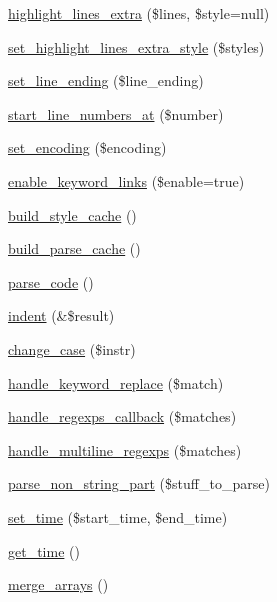 \begin{DoxyCompactItemize}
\item 
\hyperlink{class_ge_s_hi_ae1b0545f4143201ac3055abc0854196d}{highlight\-\_\-lines\-\_\-extra} (\$lines, \$style=null)
\item 
\hyperlink{class_ge_s_hi_af9596b1abed0f222229d09e671f27171}{set\-\_\-highlight\-\_\-lines\-\_\-extra\-\_\-style} (\$styles)
\item 
\hyperlink{class_ge_s_hi_ada1d16529fef7d405460dc26d95ce7d3}{set\-\_\-line\-\_\-ending} (\$line\-\_\-ending)
\item 
\hyperlink{class_ge_s_hi_a5538551eb699fee6a5f5fa1a7171232a}{start\-\_\-line\-\_\-numbers\-\_\-at} (\$number)
\item 
\hyperlink{class_ge_s_hi_a6df6fefebeccaabdc18c8127e7ad6c47}{set\-\_\-encoding} (\$encoding)
\item 
\hyperlink{class_ge_s_hi_a9c6d3744089cea99e93c5682d58b83fc}{enable\-\_\-keyword\-\_\-links} (\$enable=true)
\item 
\hyperlink{class_ge_s_hi_a3e3303eb8be497200431946eb347eddb}{build\-\_\-style\-\_\-cache} ()
\item 
\hyperlink{class_ge_s_hi_a0d8ba2d1475cad31e31378ba25520893}{build\-\_\-parse\-\_\-cache} ()
\item 
\hyperlink{class_ge_s_hi_a8eabd29ad7817796612b01e1dc7d56cf}{parse\-\_\-code} ()
\item 
\hyperlink{class_ge_s_hi_a5cdad1e4917521b8c107ddbf29065de0}{indent} (\&\$result)
\item 
\hyperlink{class_ge_s_hi_ab0a9e16a57d121907166a3c6f53822e6}{change\-\_\-case} (\$instr)
\item 
\hyperlink{class_ge_s_hi_ac805e25b3d3b98e56721d1b3923695a1}{handle\-\_\-keyword\-\_\-replace} (\$match)
\item 
\hyperlink{class_ge_s_hi_a21017883a0d35d04d8d806a7bfdd7925}{handle\-\_\-regexps\-\_\-callback} (\$matches)
\item 
\hyperlink{class_ge_s_hi_a531f5ad652fb640d9005b0d8ed8075cf}{handle\-\_\-multiline\-\_\-regexps} (\$matches)
\item 
\hyperlink{class_ge_s_hi_aa48862b4146192a1e3553bbdb0720e74}{parse\-\_\-non\-\_\-string\-\_\-part} (\$stuff\-\_\-to\-\_\-parse)
\item 
\hyperlink{class_ge_s_hi_a3c86ad4bf29c84453fd48f01aff36b9b}{set\-\_\-time} (\$start\-\_\-time, \$end\-\_\-time)
\item 
\hyperlink{class_ge_s_hi_a2635a4ec073a69f08842c7c6ff2b4b28}{get\-\_\-time} ()
\item 
\hyperlink{class_ge_s_hi_a27f98d5131da8bddb6c0237e304f59b3}{merge\-\_\-arrays} ()

\end{DoxyCompactItemize}
